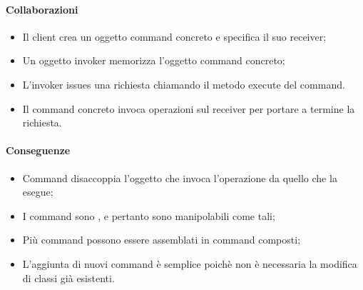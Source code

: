 \paragraph{Collaborazioni} %
\label{par:collaborazioni}

\begin{itemize}
  \item Il client crea un oggetto command concreto e specifica il suo receiver;
  \item Un oggetto invoker memorizza l'oggetto command concreto;
  \item L'invoker issues una richiesta chiamando il metodo execute del command.
  \item Il command concreto invoca operazioni sul receiver per portare a termine
  la richiesta.
\end{itemize}

\paragraph{Conseguenze} %
\label{par:conseguenze}

\begin{itemize}
  \item Command disaccoppia l'oggetto che invoca l'operazione da quello che la
  esegue;
  \item I command sono , e pertanto sono
  manipolabili come tali;
  \item Più command possono essere assemblati in command composti;
  \item L'aggiunta di nuovi command è semplice poichè non è necessaria la
  modifica di classi già esistenti.
\end{itemize}
